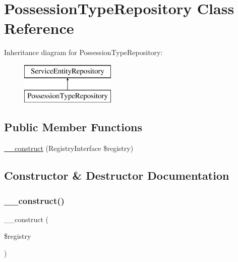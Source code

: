 \hypertarget{class_app_1_1_repository_1_1_possession_type_repository}{}\section{Possession\+Type\+Repository Class Reference}
\label{class_app_1_1_repository_1_1_possession_type_repository}
Inheritance diagram for Possession\+Type\+Repository\+:\begin{figure}[H]
\begin{center}
\leavevmode
\includegraphics[height=2.000000cm]{class_app_1_1_repository_1_1_possession_type_repository}
\end{center}
\end{figure}
\subsection*{Public Member Functions}
\begin{DoxyCompactItemize}
\item 
\mbox{\hyperlink{class_app_1_1_repository_1_1_possession_type_repository_aadca7edd263e228921a1860bb6b9c252}{\+\_\+\+\_\+construct}} (Registry\+Interface \$registry)
\end{DoxyCompactItemize}


\subsection{Constructor \& Destructor Documentation}
\mbox{\label{class_app_1_1_repository_1_1_possession_type_repository_aadca7edd263e228921a1860bb6b9c252}} 
\subsubsection{\texorpdfstring{\_\_construct()}{\_\_construct()}}
{\footnotesize\ttfamily \+\_\+\+\_\+construct (\begin{DoxyParamCaption}\item[{Registry\+Interface}]{\$registry }\end{DoxyParamCaption})}

